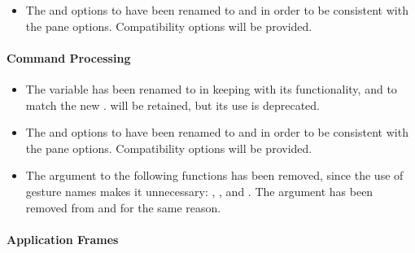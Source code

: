\begin{itemize}
\item The  and  options to
 have been renamed to  and  in
order to be consistent with the pane options.  Compatibility options will be
provided.
\end{itemize}


\paragraph {Command Processing}

\begin{itemize}
\item The variable  has been renamed to
 in keeping with its functionality, and to
match the new .   will
be retained, but its use is deprecated.

\item The  and  options to
 have been renamed to  and
 in order to be consistent with the pane options.  Compatibility
options will be provided.

\item The  argument to the following functions has been removed, since
the use of gesture names makes it unnecessary:
, , and
.  The  argument has
been removed from  and  for
the same reason.
\end{itemize}


\paragraph {Application Frames}

